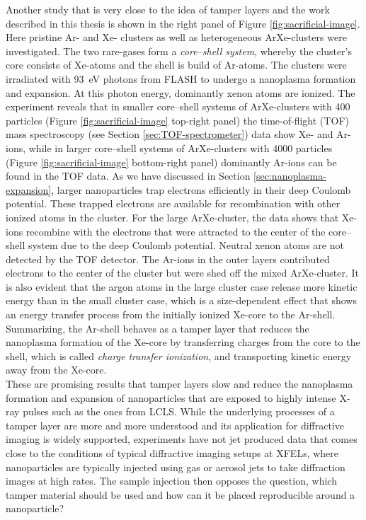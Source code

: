 Another study \citep{Hoener-2008-JPB} that is very close to the idea of tamper layers and the work described in this thesis is shown in the right panel of Figure \ref{fig:sacrificial-image}. Here pristine Ar- and Xe- clusters as well as heterogeneous ArXe-clusters were investigated. The two rare-gases form a \textit{core--shell system}, whereby the cluster's core consists of Xe-atoms and the shell is build of Ar-atoms. The clusters were irradiated with \SI{93}{\electronvolt} photons from FLASH to undergo a nanoplasma formation and expansion. At this photon energy, dominantly xenon atoms are ionized. The experiment reveals that in smaller core--shell systems of ArXe-clusters with \num{400} particles (Figure \ref{fig:sacrificial-image} top-right panel) the time-of-flight (TOF) mass spectroscopy (see Section \ref{sec:TOF-spectrometer}) data show Xe- and Ar-ions, while in larger core--shell systems of ArXe-clusters with \num{4000} particles (Figure \ref{fig:sacrificial-image} bottom-right panel) dominantly Ar-ions can be found in the TOF data. As we have discussed in Section \ref{sec:nanoplasma-expansion}, larger nanoparticles trap electrons efficiently in their deep Coulomb potential. These trapped electrons are available for recombination with other ionized atoms in the cluster. For the large ArXe-cluster, the data shows that Xe-ions recombine with the electrons that were attracted to the center of the core--shell system due to the deep Coulomb potential. Neutral xenon atoms are not detected by the TOF detector. The Ar-ions in the outer layers contributed electrons to the center of the cluster but were shed off the mixed ArXe-cluster. It is also evident that the argon atoms in the large cluster case release more kinetic energy than in the small cluster case, which is a size-dependent effect that shows an energy transfer process from the initially ionized Xe-core to the Ar-shell. Summarizing, the Ar-shell behaves as a tamper layer that reduces the nanoplasma formation of the Xe-core by transferring charges from the core to the shell, which is called \textit{charge transfer ionization}, and transporting kinetic energy away from the Xe-core.\\[1\baselineskip]
%
These are promising results that tamper layers slow and reduce the nanoplasma formation and expansion of nanoparticles that are exposed to highly intense X-ray pulses such as the ones from LCLS. While the underlying processes of a tamper layer are more and more understood and its application for diffractive imaging is widely supported, experiments have not jet produced data that comes close to the conditions of typical diffractive imaging setups at XFELs, where nanoparticles are typically injected using gas or aerosol jets to take diffraction images at high rates. The sample injection then opposes the question, which tamper material should be used and how can it be placed reproducible around a nanoparticle?
